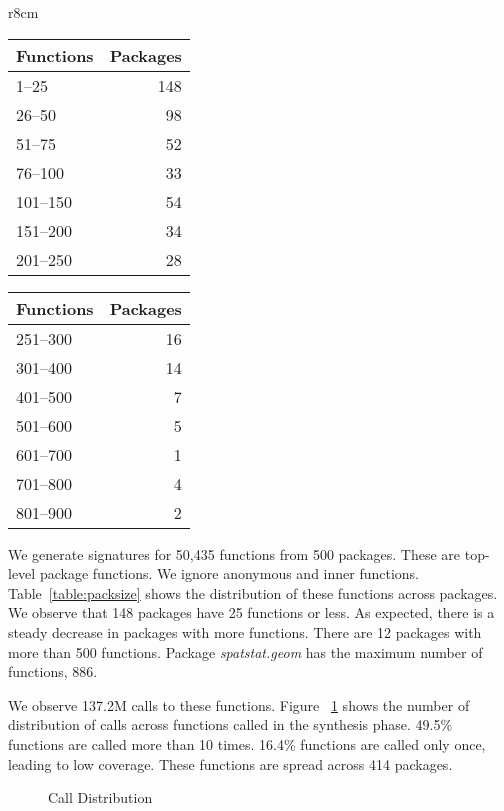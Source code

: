 \documentclass[review,nonacm,screen,acmsmall,anonymous=true]{acmart}
\begin{document}
\begin{wraptable}{r}{8cm}
  \vspace{-3mm}
  \small
  \caption{Package Size} \label{table:packsize}
  \centering
  \begin{tabular}{lr}
    \toprule
    \bf Functions&\bf Packages\\
    \midrule
    1--25&148\\
    26--50&98\\
    51--75&52\\
    76--100&33\\
    101--150&54\\
    151--200&34\\
    201--250&28\\
    \bottomrule
  \end{tabular}
  \quad
  \begin{tabular}{lr}
    \toprule
    \bf Functions&\bf Packages\\
    \midrule
    251--300&16\\
    301--400&14\\
    401--500&7\\
    501--600&5\\
    601--700&1\\
    701--800&4\\
    801--900&2\\
    \bottomrule
  \end{tabular}
\end{wraptable}

We generate signatures for 50,435 functions from 500 packages. These are
top-level package functions. We ignore anonymous and inner functions.
Table~\ref{table:packsize} shows the distribution of these functions across
packages. We observe that 148 packages have 25 functions or less. As expected,
there is a steady decrease in packages with more functions. There are 12
packages with more than 500 functions. Package \emph{spatstat.geom} has the
maximum number of functions, 886.

We observe 137.2M calls to these functions. Figure ~\ref{fig:callDist} shows the
number of distribution of calls across functions called in the synthesis
phase. 49.5\% functions are called more than 10 times. 16.4\% functions are
called only once, leading to low coverage. These functions are spread across 414
packages.

\begin{figure}[!h]
  \centering
  
  \caption{Call Distribution}
  \label{fig:callDist}
\end{figure}
\end{document}
